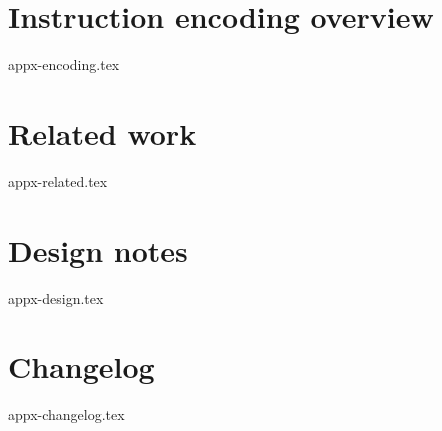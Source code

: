 \documentclass{article}
\begin{document}
\section{Instruction encoding overview} 
\label{appx:encoding}

{appx-encoding.tex}

\newpage
\section{Related work}
\label{appx:related}

{appx-related.tex}

\newpage
\section{Design notes}
\label{appx:design}

{appx-design.tex}

\newpage
\section{Changelog}
\label{appx:changelog}

{appx-changelog.tex}

\end{document}
